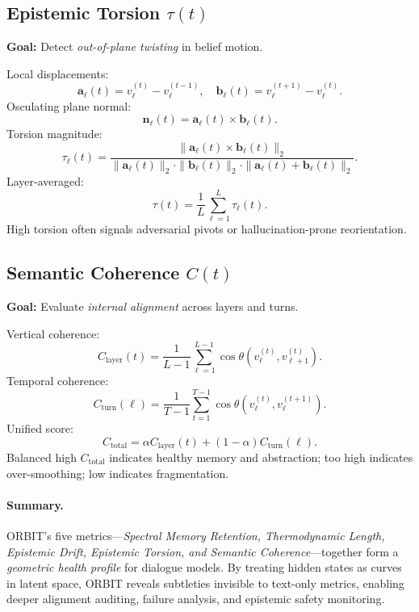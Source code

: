 \documentclass[11pt]{article}
\begin{document}
\subsection{Epistemic Torsion $\tau(t)$}

\textbf{Goal:} Detect \emph{out-of-plane twisting} in belief motion.

Local displacements:
\[
\mathbf{a}_\ell(t) = v_\ell^{(t)} - v_\ell^{(t-1)}, \quad \mathbf{b}_\ell(t) = v_\ell^{(t+1)} - v_\ell^{(t)}.
\]
Osculating plane normal:
\[
\mathbf{n}_\ell(t) = \mathbf{a}_\ell(t) \times \mathbf{b}_\ell(t).
\]
Torsion magnitude:
\[
\tau_\ell(t) = \frac{\|\mathbf{a}_\ell(t) \times \mathbf{b}_\ell(t)\|_2}{\|\mathbf{a}_\ell(t)\|_2 \cdot \|\mathbf{b}_\ell(t)\|_2 \cdot \|\mathbf{a}_\ell(t) + \mathbf{b}_\ell(t)\|_2}.
\]
Layer-averaged:
\[
\tau(t) = \frac{1}{L} \sum_{\ell=1}^L \tau_\ell(t).
\]
High torsion often signals adversarial pivots or hallucination-prone reorientation.

\subsection{Semantic Coherence $C(t)$}

\textbf{Goal:} Evaluate \emph{internal alignment} across layers and turns.

Vertical coherence:
\[
C_{\text{layer}}(t) = \frac{1}{L-1} \sum_{\ell=1}^{L-1} \cos\theta(v_\ell^{(t)}, v_{\ell+1}^{(t)}).
\]
Temporal coherence:
\[
C_{\text{turn}}(\ell) = \frac{1}{T-1} \sum_{t=1}^{T-1} \cos\theta(v_\ell^{(t)}, v_\ell^{(t+1)}).
\]
Unified score:
\[
C_{\text{total}} = \alpha C_{\text{layer}}(t) + (1 - \alpha) C_{\text{turn}}(\ell).
\]
Balanced high $C_{\text{total}}$ indicates healthy memory and abstraction; too high indicates over-smoothing; low indicates fragmentation.

\paragraph{Summary.} 
ORBIT’s five metrics---\emph{Spectral Memory Retention, Thermodynamic Length, Epistemic Drift, Epistemic Torsion, and Semantic Coherence}---together form a \emph{geometric health profile} for dialogue models. By treating hidden states as curves in latent space, ORBIT reveals subtleties invisible to text-only metrics, enabling deeper alignment auditing, failure analysis, and epistemic safety monitoring.

\clearpage
\newpage
\end{document}
